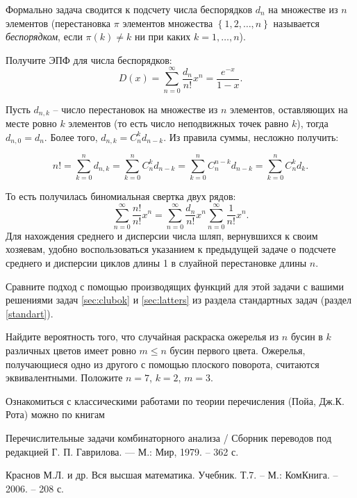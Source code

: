\begin{ordre}
Формально задача сводится к подсчету числа беспорядков $d_{n} $ на множестве из $n$ элементов (перестановка $\pi $ элементов множества $\left\{1,2,\ldots ,n\right\}$ называется  \textit{беспорядком}, если $\pi (k)\ne k$ ни при каких $k=1,\ldots ,n$).

Получите ЭПФ для числа беспорядков: $$D(x)=\sum _{n=0}^{\infty }\frac{d_{n} }{n!} x^{n}  =\frac{e^{-x} }{1-x}. $$

Пусть $d_{n,k} $ -- число перестановок на множестве из $n$ элементов, оставляющих на месте ровно $k$ элементов (то есть число неподвижных точек равно $k$), тогда $d_{n,0} =d_{n} $. Более того, $d_{n,k} =C_{n}^{k} d_{n-k} $. Из правила суммы, несложно получить:

$$ n!=\sum _{k=0}^{n}d_{n,k}  =\sum _{k=0}^{n}C_{n}^{k} d_{n-k}  =\sum _{k=0}^{n}C_{n}^{n-k} d_{n-k}  =\sum _{k=0}^{n}C_{n}^{k} d_{k}.$$

То есть получилась биномиальная свертка двух рядов:
$$
\sum _{n=0}^{\infty }\frac{n!}{n!} x^{n}  =\sum _{n=0}^{\infty }\frac{d_{n} }{n!} x^{n}  \sum _{n=0}^{\infty }\frac{1}{n!} x^{n}.
$$
Для нахождения среднего и дисперсии числа шляп, вернувшихся к своим хозяевам, удобно воспользоваться указанием к предыдущей задаче о подсчете среднего и дисперсии циклов длины 1 в слуайной перестановке длины $n$.

Сравните подход с помощью производящих функций для этой задачи с вашими решениями задач \ref{sec:clubok} и \ref{sec:latters} из раздела стандартных задач (раздел \ref{standart}).
\end{ordre}


\begin{problem}[Ожерелья]

Найдите вероятность того, что случайная раскраска ожерелья из $n$ бусин в $k$ различных цветов имеет ровно $m\le n$ бусин первого цвета. Ожерелья, получающиеся одно из другого с помощью плоского поворота, считаются эквивалентными. Положите $n=7$, $k=2$, $m=3$.

\end{problem}

\begin{remark}
Ознакомиться с классическими работами по теории перечисления (Пойа, Дж.К. Рота) можно по книгам

Перечислительные задачи комбинаторного анализа / Сборник переводов под редакцией Г. П. Гаврилова.  — М.: Мир, 1979. -- 362 с.

Краснов М.Л. и др. Вся высшая математика. Учебник. Т.7. -- М.: КомКнига. -- 2006. -- 208 с.
\end{remark}

